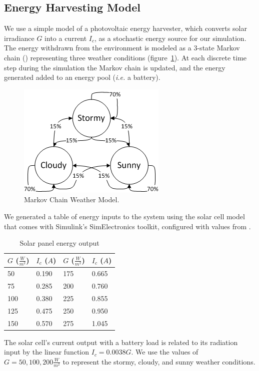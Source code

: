 \subsection{Energy Harvesting Model}
We use a simple model of a photovoltaic energy harvester, which converts solar irradiance $G$ into a current $I_c$, as a stochastic energy source for our simulation.  The energy withdrawn from the environment is modeled as a 3-state Markov chain (\cite{poggi2000stochastic,moser2007real}) representing three weather conditions (figure~\ref{fig:markov}).  At each discrete time step during the simulation the Markov chain is updated, and the energy generated added to an energy pool (\emph{i.e.} a battery).
\begin{figure}[htb]
\begin{center}
\label{fig:markov}
\caption{Markov Chain Weather Model.}
\includegraphics[scale=0.8]{markov.png}
\end{center}
\end{figure}
We generated a table of energy inputs to the system using the solar cell model that comes with Simulink's SimElectronics toolkit, configured with values from \cite{gonzalez2006model}.  
\begin{table}[h]
\begin{center}
\begin{tabular}{| l | l || l | l |}
\hline
\textbf{$G$ ($\frac{W}{m^2}$)} & \textbf{$I_c$ ($A$)} & \textbf{$G$ ($\frac{W}{m^2}$)} & \textbf{$I_c$ ($A$)} \\
\hline
50 & 0.190 & 175 & 0.665 \\
75 & 0.285 & 200 & 0.760 \\
100 & 0.380 & 225 & 0.855 \\
125 & 0.475 & 250 & 0.950 \\
150 & 0.570 & 275 & 1.045 \\
\hline
\end{tabular}
\end{center}
\label{tab:radiance}
\caption{Solar panel energy output}
\end{table}
The solar cell's current output with a battery load is related to its radiation input by the linear function $I_c = 0.0038G$.  We use the values of $G = 50, 100, 200 \frac{W}{m^2}$ to represent the stormy, cloudy, and sunny weather conditions.

